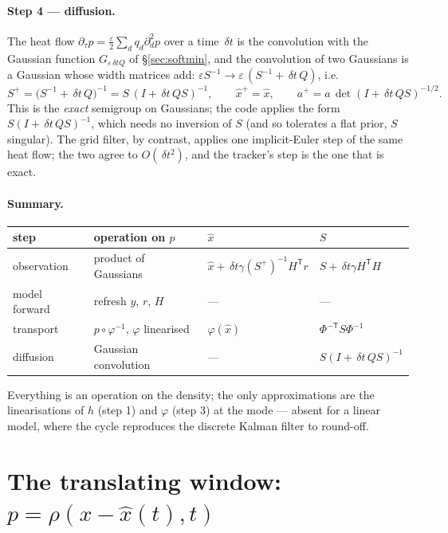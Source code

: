 \documentclass[11pt,a4paper]{article}
\newcommand{\T}{^{\mathsf T}}
\newcommand{\xh}{\hat{x}}
\newcommand{\eps}{\varepsilon}
\newcommand{\dt}{\,\delta t}
\theoremstyle{plain}
\theoremstyle{definition}
\theoremstyle{remark}
\begin{document}
\paragraph{Step 4 --- diffusion.}
The heat flow $\partial_\tau p = \tfrac\eps2\sum_dq_d\partial_d^2p$ over a time $\dt$ is the convolution with the Gaussian function $G_{\eps\dt Q}$ of \S\ref{sec:softmin}, and the convolution of two Gaussians is a Gaussian whose width matrices add: $\eps S^{-1} \to \eps\,(S^{-1} + \dt\,Q)$, i.e.
\begin{equation}
  S^+ = \big(S^{-1} + \dt\,Q\big)^{-1} = S\,(I + \dt\,QS)^{-1}, \qquad \xh^+ = \xh, \qquad a^+ = a\,\det(I+\dt\,QS)^{-1/2}.
  \label{eq:cycle_diff}
\end{equation}
This is the \emph{exact} semigroup on Gaussians; the code applies the form $S(I+\dt\,QS)^{-1}$, which needs no inversion of $S$ (and so tolerates a flat prior, $S$ singular). The grid filter, by contrast, applies one implicit-Euler step of the same heat flow; the two agree to $O(\dt^2)$, and the tracker's step is the one that is exact.

\paragraph{Summary.}
\begin{center}\small
\begin{tabular}{@{}llll@{}}
\toprule
step & operation on $p$ & $\xh$ & $S$ \\
\midrule
observation & product of Gaussians & $\xh + \dt\gamma(S^+)^{-1}H\T r$ & $S+\dt\gamma H\T H$ \\
model forward & refresh $y$, $r$, $H$ & --- & --- \\
transport & $p\circ\varphi^{-1}$, $\varphi$ linearised & $\varphi(\xh)$ & $\Phi^{-\mathsf T}S\Phi^{-1}$ \\
diffusion & Gaussian convolution & --- & $S(I+\dt\,QS)^{-1}$ \\
\bottomrule
\end{tabular}
\end{center}
Everything is an operation on the density; the only approximations are the linearisations of $h$ (step 1) and $\varphi$ (step 3) at the mode --- absent for a linear model, where the cycle reproduces the discrete Kalman filter to round-off.

\section{The translating window: \texorpdfstring{$p=\rho(x-\xh(t),t)$}{p = rho(x - xhat(t), t)}}
\label{sec:window}
\end{document}
